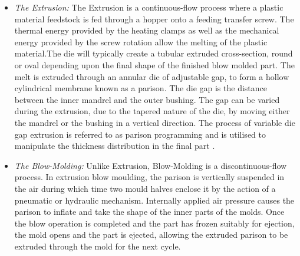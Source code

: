 \begin{itemize}
    \item \textit{The Extrusion:} The Extrusion is a continuous-flow process where a plastic material feedstock is fed through a hopper onto a feeding transfer screw. The thermal energy provided by the heating clamps as well as the mechanical energy provided by the screw rotation allow the melting of the plastic material.The die will typically create a tubular extruded cross-section, round or oval depending upon the final shape of the finished blow molded part. The melt is extruded through an annular die of adjustable gap, to form a hollow cylindrical membrane known as a parison. The die gap is the distance between the inner mandrel and the outer bushing. The gap can be varied during the extrusion, due to the tapered nature of the die, by moving either the mandrel or the bushing in a vertical direction. The process of variable die gap extrusion is referred to as parison programming and is utilised to manipulate the thickness distribution in the final part \citep{diraddo1993profile}.
    \item \textit{The Blow-Molding:} Unlike Extrusion, Blow-Molding is a discontinuous-flow process. In extrusion blow moulding, the parison is vertically suspended in the air during which time two mould halves enclose it by the action of a pneumatic or hydraulic mechanism. Internally applied air pressure causes the parison to inflate and take the shape of the inner parts of the molds. Once the blow operation is completed and the part has frozen suitably for ejection, the mold opens and the part is ejected, allowing the extruded parison to be extruded through the mold for the next cycle. 
\end{itemize}

